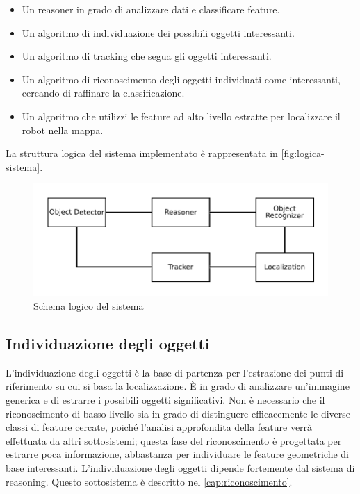 \begin{itemize}
 \item Un reasoner in grado di analizzare dati e classificare feature.
 \item Un algoritmo di individuazione dei possibili oggetti interessanti.
 \item Un algoritmo di tracking che segua gli oggetti interessanti.
 \item Un algoritmo di riconoscimento degli oggetti individuati come interessanti, cercando di raffinare la classificazione.
 \item Un algoritmo che utilizzi le feature ad alto livello estratte per localizzare il robot nella mappa.
\end{itemize}

La struttura logica del sistema implementato è rappresentata in \autoref{fig:logica-sistema}.

\begin{figure}[ht]
  \includegraphics[width=\textwidth]{diagrammi/SchemaLogico}
  \caption{Schema logico del sistema}
  \label{fig:logica-sistema}
\end{figure}

\subsection{Individuazione degli oggetti}
L'individuazione degli oggetti è la base di partenza per l'estrazione dei punti di riferimento su cui si basa la localizzazione.
\`E in grado di analizzare un'immagine generica e di estrarre i possibili oggetti significativi.
Non è necessario che il riconoscimento di basso livello sia in grado di distinguere efficacemente le diverse classi di feature cercate, poiché l'analisi approfondita della feature verrà effettuata da altri sottosistemi; questa fase del riconoscimento è progettata per estrarre poca informazione, abbastanza per individuare le feature geometriche di base interessanti.
L'individuazione degli oggetti dipende fortemente dal sistema di reasoning.
Questo sottosistema è descritto nel \autoref{cap:riconoscimento}.

